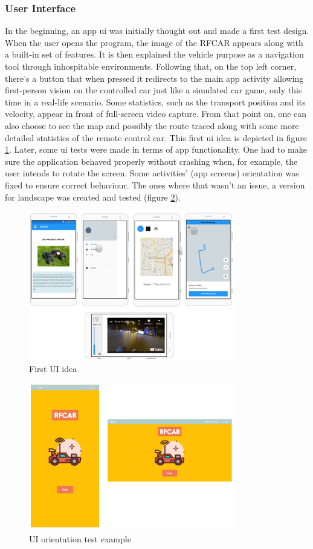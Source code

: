 \subsubsection{User Interface}%
\label{sec:user-interface}
In the beginning, an app \gls{ui} was initially thought out and made a first test design.
When the user opens the program, the image of the RFCAR appears along with a built-in set of features. It is then explained the vehicle purpose as a navigation tool through inhospitable environments.
%
Following that, on the top left corner, there's a button that when pressed it redirects to the main app activity allowing first-person vision on the controlled car just like a simulated car game, only this time in a real-life scenario. Some statistics, such as the transport position and its velocity, appear in front of full-screen video capture.
%
From that point on, one can also choose to see the map and possibly the route traced along with some more detailed statistics of the remote control car. This first \gls{ui} idea is depicted in figure \ref{fig:first-ui-idea}. Later, some \gls{ui} tests were made in terms of app functionality. One had to make sure the application behaved properly without crashing when, for example, the user intends to rotate the screen. Some activities' (app screens) orientation was fixed to ensure correct behaviour. The ones where that wasn't an issue, a version for landscape was created and tested (figure \ref{fig:orientation-test}). 
%
\begin{figure}[!ht]
\centering
\includegraphics[width=0.8\textwidth]{img/Initial-app-idea.png}
\caption{\label{fig:first-ui-idea}First UI idea}
\end{figure}
%
\begin{figure}[!ht]
\centering
\includegraphics[width=0.8\textwidth]{img/orientation-test.png}
\caption{\label{fig:orientation-test}UI orientation test example}
\end{figure}
